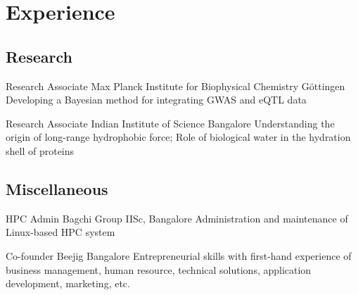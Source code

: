 \section{Experience}
\subsection{Research}
        {Research Associate}
        {Max Planck Institute for Biophysical Chemistry}
        {G\"ottingen}
        {}
        {Developing a Bayesian method for integrating GWAS and eQTL data}

        {Research Associate}
        {Indian Institute of Science}
        {Bangalore}
        {}
        {Understanding the origin of long-range hydrophobic force; Role of biological water in the hydration shell of proteins}

\subsection{Miscellaneous}
        {HPC Admin}
        {Bagchi Group}
        {IISc, Bangalore}
        {}
        {Administration and maintenance of Linux-based HPC system}

        {Co-founder}
        {Beejig}
        {Bangalore}
        {}
        {Entrepreneurial skills with first-hand experience of business management, human resource, technical solutions, application development, marketing, etc.}
